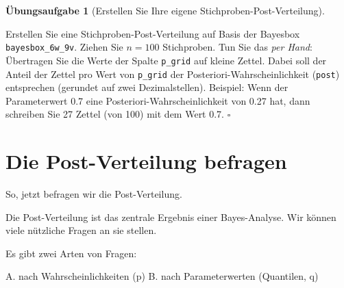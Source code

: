 \documentclass[
  ngerman,
  letterpaper,
  twoside,
  open=any]{scrbook}
\theoremstyle{definition}
\theoremstyle{plain}
\theoremstyle{definition}
\newtheorem{exercise}{Übungsaufgabe}[chapter]
\theoremstyle{definition}
\theoremstyle{definition}
\theoremstyle{definition}
\newtheorem{exercise}{Übungsaufgabe}[chapter]
\theoremstyle{remark}
\begin{document}
\begin{exercise}[Erstellen Sie Ihre eigene
Stichproben-Post-Verteilung]\protect\hypertarget{exr-samples-diy}{}\label{exr-samples-diy}

Erstellen Sie eine Stichproben-Post-Verteilung auf Basis der Bayesbox
\texttt{bayesbox\_6w\_9v}. Ziehen Sie \(n=100\) Stichproben. Tun Sie das
\emph{per Hand}: Übertragen Sie die Werte der Spalte \texttt{p\_grid}
auf kleine Zettel. Dabei soll der Anteil der Zettel pro Wert von
\texttt{p\_grid} der Posteriori-Wahrscheinlichkeit (\texttt{post})
entsprechen (gerundet auf zwei Dezimalstellen). Beispiel: Wenn der
Parameterwert 0.7 eine Posteriori-Wahrscheinlichkeit von 0.27 hat, dann
schreiben Sie 27 Zettel (von 100) mit dem Wert 0.7. \(\square\)

\end{exercise}

\section{Die Post-Verteilung
befragen}\label{die-post-verteilung-befragen}

So, jetzt befragen wir die Post-Verteilung.

\begin{tcolorbox}[enhanced jigsaw, arc=.35mm, bottomrule=.15mm, bottomtitle=1mm, breakable, colback=white, colbacktitle=quarto-callout-important-color!10!white, colframe=quarto-callout-important-color-frame, coltitle=black, left=2mm, leftrule=.75mm, opacityback=0, opacitybacktitle=0.6, rightrule=.15mm, title=\textcolor{quarto-callout-important-color}{\faExclamation}\hspace{0.5em}{Wichtig}, titlerule=0mm, toprule=.15mm, toptitle=1mm]

Die Post-Verteilung ist das zentrale Ergebnis einer Bayes-Analyse. Wir
können viele nützliche Fragen an sie stellen.

\end{tcolorbox}

Es gibt zwei Arten von Fragen:

A. nach Wahrscheinlichkeiten (p) B. nach Parameterwerten (Quantilen, q)
\end{document}
